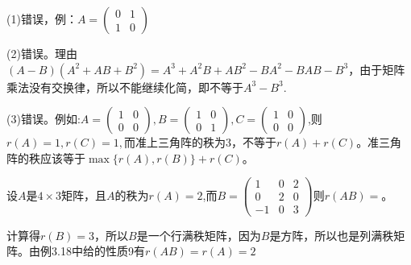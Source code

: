 \documentclass[a4paper]{report}
\begin{document}
\begin{jie}
(1)错误，例：$A=
\begin{pmatrix}
0&1 \\ 1&0
\end{pmatrix}
$

(2)错误。理由$(A-B)(A^2+AB+B^2)=A^3+A^2B+AB^2-BA^{2}-BAB-B^3$，由于矩阵乘法没有交换律，所以不能继续化简，即不等于$A^3-B^3$.

(3)错误。例如:$A=
\begin{pmatrix}
1&0\\0&0
\end{pmatrix},B=
\begin{pmatrix}
1&0\\0&1
\end{pmatrix},C=
\begin{pmatrix}
1&0\\0&0
\end{pmatrix}
$,则$r(A)=1,r(C)=1,$而准上三角阵的秩为3，不等于$r(A)+r(C)$。准三角阵的秩应该等于$\max\{r(A),r(B)\}+r(C)$。
\end{jie}

\EX 设$A$是$4\times 3$矩阵，且$A$的秩为$r(A)=2$,而$B=
\begin{pmatrix}
1&0&2\\
0&2&0\\
-1&0&3
\end{pmatrix}
$则$r(AB)=$\underline{\hphantom{~~~~~~~}}。

\begin{jie}
计算得$r(B)=3$，所以$B$是一个行满秩矩阵，因为$B$是方阵，所以也是列满秩矩阵。由例3.18中给的性质9有$r(AB)=r(A)=2$
\end{jie}
\end{document}

